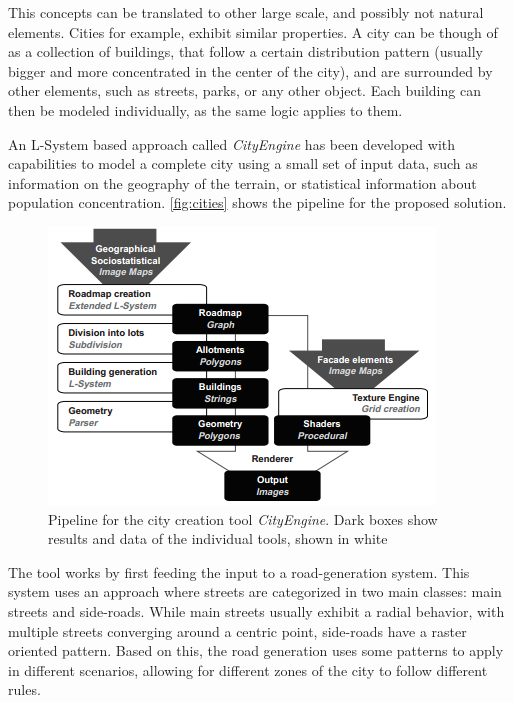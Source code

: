 \documentclass{acmtog}
\begin{document}
This concepts can be translated to other large scale, and possibly not natural elements. Cities for example, exhibit similar properties. A city can be though of as a collection of buildings, that follow a certain distribution pattern (usually bigger and more concentrated in the center of the city), and are surrounded by other elements, such as streets, parks, or any other object. Each building can then be modeled individually, as the same logic applies to them.

An L-System based approach called \emph{CityEngine} has been developed with capabilities to model a complete city using a small set of input data, such as information on the geography of the terrain, or statistical information about population concentration. \autoref{fig:cities} shows the pipeline for the proposed solution.

\begin{figure}[!htp]
  \begin{center}
    \includegraphics[width=0.8\columnwidth]{images/9_cities}
    \caption{Pipeline for the city creation tool \emph{CityEngine}. Dark boxes show results and data of the individual tools, shown in white \label{fig:cities}}
    \end{center}
\end{figure}

The tool works by first feeding the input to a road-generation system. This system uses an approach where streets are categorized in two main classes: main streets and side-roads. While main streets usually exhibit a radial behavior, with multiple streets converging around a centric point, side-roads have a raster oriented pattern. Based on this, the road generation uses some patterns to apply in different scenarios, allowing for different zones of the city to follow different rules.
\end{document}
